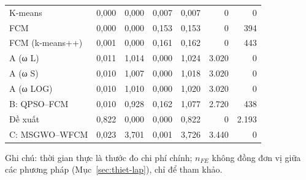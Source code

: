 {\begin{longtable}{@{}lrrrrrr@{}}
K-means & 0,000 & 0,000 & 0,007 & 0,007 & 0 & 0 \\
FCM & 0,000 & 0,000 & 0,153 & 0,153 & 0 & 394 \\
FCM (k-means++) & 0,001 & 0,000 & 0,161 & 0,162 & 0 & 443 \\
A (ω L) & 0,011 & 1,014 & 0,000 & 1,024 & 3.020 & 0 \\
A (ω S) & 0,010 & 1,007 & 0,000 & 1,018 & 3.020 & 0 \\
A (ω LOG) & 0,010 & 1,010 & 0,000 & 1,020 & 3.020 & 0 \\
B: QPSO–FCM & 0,010 & 0,928 & 0,162 & 1,077 & 2.720 & 438 \\
Đề xuất & 0,822 & 0,000 & 0,000 & 0,822 & 0 & 2.193 \\
C: MSGWO–WFCM & 0,023 & 3,701 & 0,001 & 3,726 & 3.440 & 0 \\
\end{longtable}
}
{\scriptsize\noindent Ghi chú: thời gian thực là thước đo chi phí chính; $n_{FE}$ không đồng đơn vị giữa các phương pháp (Mục~\ref{sec:thiet-lap}), chỉ để tham khảo.\par}
